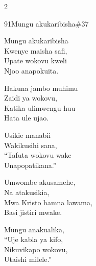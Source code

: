 \begin{multicols}{2}
\begin{hymn}{91}{Mungu akukaribisha}{\#37}
\begin{stanza}
Mungu akukaribisha\\
Kwenye maisha safi,\\
Upate wokovu kweli\\
Njoo anapokuita.
\end{stanza}
\begin{chorus}
Hakuna jambo muhimu\\
Zaidi ya wokovu,\\
Katika ulimwengu huu\\
Hata ule ujao.
\end{chorus}
\begin{stanza}
Usikie manabii\\
Wakikusihi sana,\\
``Tafuta wokovu wake\\
Unapopatikana.''
\end{stanza}
\begin{stanza}
Umwombe akusamehe,\\
Na atakusikia,\\
Mwa Kristo hamna lawama,\\
Basi jistiri mwake.
\end{stanza}
\begin{stanza}
Mungu anakualika,\\
``Uje kabla ya kifo,\\
Nikuvikapo wokovu,\\
Utaishi milele.''
\end{stanza}
\end{hymn}


\end{multicols}
